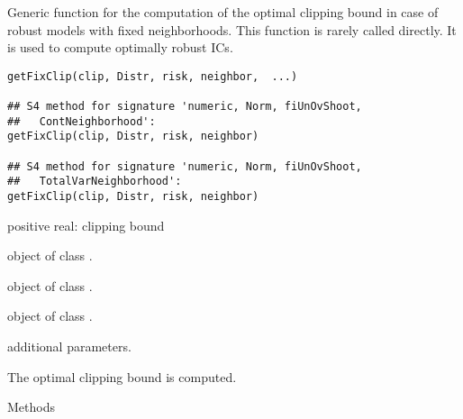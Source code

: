 \begin{Description}\relax
Generic function for the computation of the optimal clipping bound
in case of robust models with fixed neighborhoods. This function is 
rarely called directly. It is used to compute optimally robust ICs.
\end{Description}
\begin{Usage}
\begin{verbatim}
getFixClip(clip, Distr, risk, neighbor,  ...)

## S4 method for signature 'numeric, Norm, fiUnOvShoot,
##   ContNeighborhood':
getFixClip(clip, Distr, risk, neighbor)

## S4 method for signature 'numeric, Norm, fiUnOvShoot,
##   TotalVarNeighborhood':
getFixClip(clip, Distr, risk, neighbor)
\end{verbatim}
\end{Usage}
\begin{Arguments}
\begin{ldescription}
\item[\code{clip}] positive real: clipping bound 
\item[\code{Distr}] object of class . 
\item[\code{risk}] object of class . 
\item[\code{neighbor}] object of class . 
\item[\code{...}] additional parameters. 
\end{ldescription}
\end{Arguments}
\begin{Value}
The optimal clipping bound is computed.
\end{Value}
\begin{Section}{Methods}
\end{Section}
